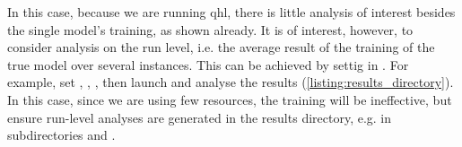 In this case, because we are running \gls{qhl}, there is little analysis of interest besides the single model's training, 
    as shown already. 
It is of interest, however, to consider analysis on the \gls{run} level, i.e. the average result of the training 
    of the true model over several instances. 
This can be achieved by settig  in . 
For example, set , , , then launch and analyse the results (\cref{listing:results_directory}). 
In this case, since we are using few resources, the training will be ineffective, 
    but ensure run-level analyses are generated in the results directory, e.g. in subdirectories  and . 
\par 



